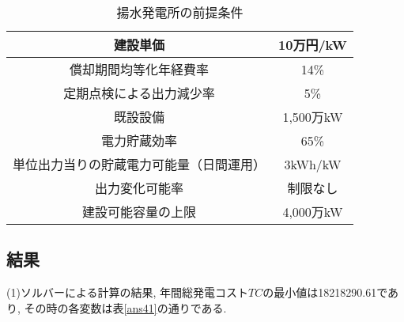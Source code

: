 \documentclass[]{jsarticle}
\begin{document}
    \begin{table}[htb]
      \begin{center}
        \caption{揚水発電所の前提条件\cite{t}}
        \begin{tabular}{|c|c|} \hline
          建設単価 & 10万円/kW \\ \hline
          償却期間均等化年経費率 & 14\% \\ \hline
          定期点検による出力減少率 & 5\% \\ \hline
          既設設備 & 1,500万kW \\ \hline
          電力貯蔵効率 & 65\% \\ \hline
          単位出力当りの貯蔵電力可能量（日間運用） & 3kWh/kW \\ \hline
          出力変化可能率 & 制限なし \\ \hline
          建設可能容量の上限 & 4,000万kW \\ \hline
        \end{tabular}
        \label{yousuijouken}
      \end{center}
    \end{table}


  \subsection{結果}
      (1)ソルバーによる計算の結果, 年間総発電コスト$TC$の最小値は18218290.61であり, その時の各変数は表\ref{ans41}の通りである.
\end{document}
